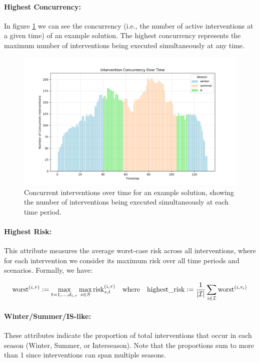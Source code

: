 \paragraph{Highest Concurrency:} In figure \ref{fig:concurrency} we can see the concurrency (i.e., the number of active interventions at a given time) of an example solution. The highest concurrency represents the maximum number of interventions being executed simultaneously at any time. 

\begin{figure}[ht]
    \centering
    \includegraphics[width=\textwidth]{ch3/figures/Concurrency.png}
    \caption{Concurrent interventions over time for an example solution, showing the number of interventions being executed simultaneously at each time period.}
    \label{fig:concurrency}
\end{figure}



\paragraph{Highest Risk:} This attribute measures the average worst-case risk across all interventions, where for each intervention we consider its maximum risk over all time periods and scenarios. Formally, we have:

\[\operatorname{worst}^{(i,\tau)} \mathrel{\mathop:}= \max_{t=1,\dots,d_{i,\tau}} \max_{s\in S} \mathrm{risk}_{s,t}^{(i,\tau)} \quad \text{where} \quad \text{highest\_risk} \mathrel{\mathop:}= \frac{1}{|\mathcal{I}|}\sum_{i\in\mathcal{I}} \operatorname{worst}^{(i,\tau_i)}\]



\paragraph{Winter/Summer/IS-like:} These attributes indicate the proportion of total interventions that occur in each season (Winter, Summer, or Interseason). Note that the proportions sum to more than 1 since interventions can span multiple seasons.